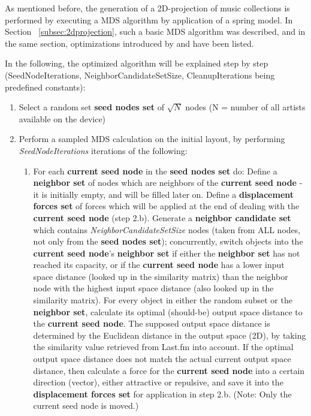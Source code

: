 As mentioned before, the generation of a 2D-projection of music collections is performed by executing a MDS algorithm by application of a spring model. In Section ~\ref{subsec:2dprojection}, such a basic MDS algorithm was described, and in the same section, optimizations introduced by \cite{Chalmers:1996:LIT:244979.245035} and \cite{Morrison:2003:FMS} have been listed.

In the following, the optimized algorithm will be explained step by step (SeedNodeIterations, NeighborCandidateSetSize, CleanupIterations being predefined constants):

\begin{enumerate}
	\item Select a random set \textbf{seed nodes set} of $\sqrt{N}$ nodes (N = number of all artists available on the device)
	\item Perform a sampled MDS calculation on the initial layout, by performing \emph{SeedNodeIterations} iterations of the following:
		\begin{enumerate}
			\item For each \textbf{current seed node} in the \textbf{seed nodes set} do:
				\subitem Define a \textbf{neighbor set} of nodes which are neighbors of the \textbf{current seed node} - it is initially empty, and will be filled later on. Define a \textbf{displacement forces set} of forces which will be applied at the end of dealing with the \textbf{current seed node} (step 2.b).
				\subitem Generate a \textbf{neighbor candidate set} which contains \emph{NeighborCandidateSetSize} nodes (taken from ALL nodes, not only from the \textbf{seed nodes set}); concurrently, switch objects into the \textbf{current seed node}'s \textbf{neighbor set} if either the \textbf{neighbor set} has not reached its capacity, or if the \textbf{current seed node} has a lower input space distance (looked up in the similarity matrix) than the neighbor node with the highest input space distance (also looked up in the similarity matrix).
				\subitem For every object in either the random subset or the \textbf{neighbor set}, calculate its optimal (should-be) output space distance to the \textbf{current seed node}. The supposed output space distance is determined by the Euclidean distance in the output space (2D), by taking the similarity value retrieved from Last.fm into account.
				\subitem If the optimal output space distance does not match the actual current output space distance, then calculate a force for the \textbf{current seed node} into a certain direction (vector), either attractive or repulsive, and save it into the \textbf{displacement forces set} for application in step 2.b. (Note: Only the current seed node is moved.)

\end{enumerate}
\end{enumerate}
